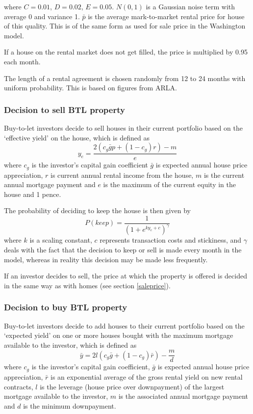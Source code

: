 \documentclass{article}
\begin{document}
where $C=0.01$, $D=0.02$, $E=0.05$. $N(0,1)$ is a Gaussian noise term with
average 0 and variance 1. $\bar{p}$ is the average mark-to-market rental
price for house of this quality. This is of the same form as used for sale price in the Washington model.

If a house on the rental market does not get filled, the price is multiplied by 0.95 each month.

The length of a rental agreement is
chosen randomly from 12 to 24 months with uniform probability. This is based on figures from ARLA.

\subsubsection{Decision to sell BTL property}

Buy-to-let investors decide to sell houses in their current portfolio based on the `effective yield' on the house, which is defined as
\[
y_e = \frac{2(c_g \bar{g}p + (1-c_g)r) - m}{e} 
\]
where $c_g$ is the investor's capital gain coefficient $\bar{g}$ is expected annual house price appreciation, $r$ is current annual rental income from the house, $m$ is the current annual mortgage payment and $e$ is the maximum of the current equity in the house and 1 pence.

The probability of deciding to keep the house is then given by
\[
P(keep) = \frac{1}{(1 + e^{ky_e+c})^\gamma}
\]
where $k$ is a scaling constant, $c$ represents transaction costs and stickiness, and $\gamma$ deals with the fact that the decision to keep or sell is made every month in the model, whereas in reality this decision may be made less frequently.

If an investor decides to sell, the price at which the property is offered is decided in the same way as with homes (see section \ref{saleprice}).

\subsubsection{Decision to buy BTL property}
Buy-to-let investors decide to add houses to their current portfolio based on the `expected yield' on one or more houses bought with the maximum mortgage available to the investor, which is defined as
\[
\bar{y} = 2l(c_g \bar{g} + (1-c_g)\bar{r}) - \frac{m}{d} 
\]
where $c_g$ is the investor's capital gain coefficient, $\bar{g}$ is expected annual house price appreciation, $\bar{r}$ is an exponential average of the gross rental yield on new rental contracts, $l$ is the leverage (house price over downpayment) of the largest mortgage available to the investor, $m$ is the associated annual mortgage payment and $d$ is the minimum downpayment.
\end{document}
